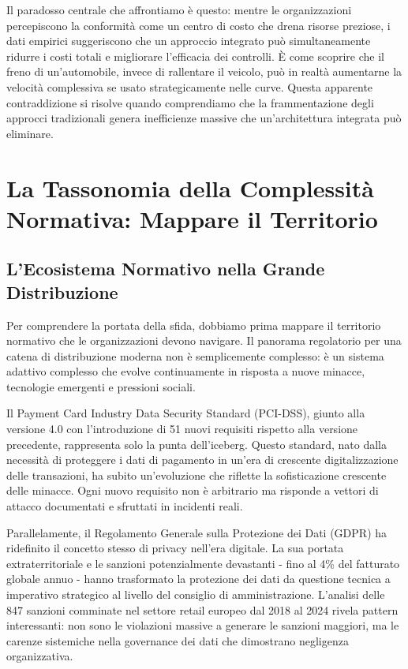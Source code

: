 Il paradosso centrale che affrontiamo è questo: mentre le organizzazioni percepiscono la conformità come un centro di costo che drena risorse preziose, i dati empirici suggeriscono che un approccio integrato può simultaneamente ridurre i costi totali e migliorare l'efficacia dei controlli. È come scoprire che il freno di un'automobile, invece di rallentare il veicolo, può in realtà aumentarne la velocità complessiva se usato strategicamente nelle curve. Questa apparente contraddizione si risolve quando comprendiamo che la frammentazione degli approcci tradizionali genera inefficienze massive che un'architettura integrata può eliminare.

\section{La Tassonomia della Complessità Normativa: Mappare il Territorio}

\subsection{L'Ecosistema Normativo nella Grande Distribuzione}

Per comprendere la portata della sfida, dobbiamo prima mappare il territorio normativo che le organizzazioni devono navigare. Il panorama regolatorio per una catena di distribuzione moderna non è semplicemente complesso: è un sistema adattivo complesso che evolve continuamente in risposta a nuove minacce, tecnologie emergenti e pressioni sociali.

Il Payment Card Industry Data Security Standard (PCI-DSS), giunto alla versione 4.0 con l'introduzione di 51 nuovi requisiti rispetto alla versione precedente\autocite{pcidss2024}, rappresenta solo la punta dell'iceberg. Questo standard, nato dalla necessità di proteggere i dati di pagamento in un'era di crescente digitalizzazione delle transazioni, ha subito un'evoluzione che riflette la sofisticazione crescente delle minacce. Ogni nuovo requisito non è arbitrario ma risponde a vettori di attacco documentati e sfruttati in incidenti reali.

Parallelamente, il Regolamento Generale sulla Protezione dei Dati (GDPR) ha ridefinito il concetto stesso di privacy nell'era digitale. La sua portata extraterritoriale e le sanzioni potenzialmente devastanti - fino al 4\% del fatturato globale annuo - hanno trasformato la protezione dei dati da questione tecnica a imperativo strategico al livello del consiglio di amministrazione. L'analisi delle 847 sanzioni comminate nel settore retail europeo dal 2018 al 2024\autocite{EDPB2024} rivela pattern interessanti: non sono le violazioni massive a generare le sanzioni maggiori, ma le carenze sistemiche nella governance dei dati che dimostrano negligenza organizzativa.

